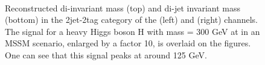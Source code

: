 \begin{figure}[h!]
\begin{center}
~\\
\end{center}
\caption{Reconstructed di-\Pgt invariant mass (top) and di-jet invariant mass (bottom) in the 2jet-2tag category of the \mutau (left) and \etau (right)
channels. The signal for a heavy Higgs boson H with mass \mH = 300 GeV at  in an MSSM scenario, enlarged by a factor 10, is overlaid on the figures.
One can see that this signal peaks at around 125 GeV.}
\label{fig:Hhh_selection_masscuts}
\end{figure}

